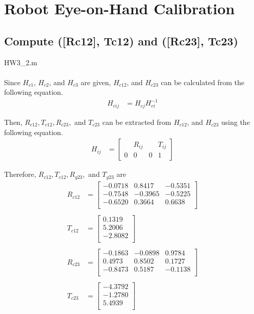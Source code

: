 \documentclass[]{article}
\begin{document}
\newpage
\section{Robot Eye-on-Hand Calibration}
\subsection{Compute ([Rc12], Tc12) and ([Rc23], Tc23)}
HW3\_2.m\\
\\
\indent Since $H_{c1}$, $H_{c2}$, and $H_{c3}$ are given, $H_{c12}$, and $H_{c23}$ can be calculated from the following equation.
\begin{align*}
H_{cij} &= H_{cj}H_{ci}^{-1}
\end{align*}

\indent  Then, $R_{c12}, T_{c12}, R_{c23},$ and $T_{c23}$ can be extracted from $H_{c12}$, and $H_{c23}$ using the following equation.
\begin{align*}
H_{ij} &=
\begin{bmatrix}
 & R_{ij} & & T_{ij}\\
0 & 0 & 0 & 1
\end{bmatrix}
\end{align*}

\indent Therefore, $R_{c12}, T_{c12}, R_{g23},$ and $T_{g23}$ are
\begin{align*}
R_{c12} &=
\begin{bmatrix}
-0.0718 &  0.8417 & -0.5351 \\
-0.7548 & -0.3965 & -0.5225 \\
-0.6520 &  0.3664 &  0.6638 \\
\end{bmatrix}\\
\\
T_{c12} &=
\begin{bmatrix}
0.1319\\
5.2006\\
-2.8082\\
\end{bmatrix}\\
\\
R_{c23} &=
\begin{bmatrix}
-0.1863 & -0.0898 &  0.9784\\
0.4973  &  0.8502 &  0.1727\\
-0.8473 &  0.5187 & -0.1138\\
\end{bmatrix}\\
\\
T_{c23} &=
\begin{bmatrix}
-4.3792\\
-1.2780\\
5.4939\\
\end{bmatrix}
\end{align*}
\end{document}
